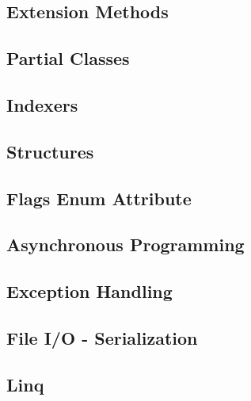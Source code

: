 \subsection{Extension Methods}
\label{extension}


\subsection{Partial Classes}
\label{partialClass}


\subsection{Indexers}
\label{indexers}


\subsection{Structures}
\label{structures}


\subsection{Flags Enum Attribute}
\label{flags}


\subsection{Asynchronous Programming}
\label{asynchronousProgramming}


\subsection{Exception Handling}
\label{exceptionHandling}


\subsection{File I/O - Serialization}
\label{fileIO}


\subsection{Linq}
\label{linq}

